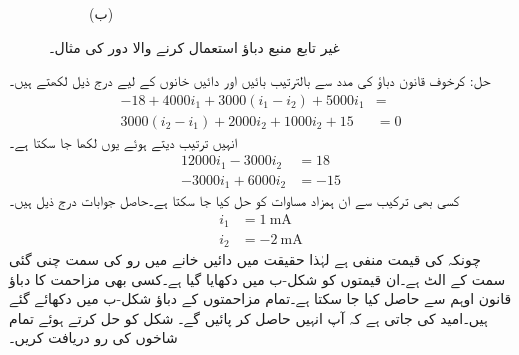 \begin{figure}
\begin{subfigure}{1\textwidth}
%
\caption*{(ب)}
\end{subfigure}
\caption{غیر تابع منبع دباؤ استعمال کرنے والا دور کی مثال۔}
\label{شکل_جوڑ_آزاد_منبع_دباو_دائری_مثال_الف}
\end{figure}%

حل: کرخوف قانون دباؤ کی مدد سے بالترتیب بائیں اور دائیں خانوں کے لیے درج ذیل لکھتے ہیں۔
\begin{align*}
-18+4000 i_1 +3000(i_1-i_2)+5000 i_1&=\\
3000(i_2-i_1)+2000 i_2+1000 i_2+15&=0
\end{align*} 
انہیں ترتیب دیتے ہوئے یوں لکھا جا سکتا ہے۔
\begin{align*}
12000 i_1-3000 i_2&=18\\
-3000 i_1+6000 i_2&=-15
\end{align*}
کسی بھی ترکیب سے ان ہمزاد مساوات کو حل کیا جا سکتا ہے۔حاصل جوابات درج ذیل ہیں۔
\begin{align*}
i_1&=\SI{1}{\milli\ampere}\\
i_2&=\SI{-2}{\milli\ampere}
\end{align*}
چونکہ  کی قیمت منفی ہے لہٰذا حقیقت میں دائیں خانے میں رو کی سمت چنی گئی سمت کے الٹ ہے۔ان قیمتوں کو شکل-ب میں دکھایا گیا ہے۔کسی بھی مزاحمت کا دباؤ قانون اوہم سے حاصل کیا جا سکتا ہے۔تمام مزاحمتوں کے دباؤ شکل-ب میں دکھائے گئے ہیں۔امید کی جاتی ہے کہ آپ انہیں حاصل کر پائیں گے۔
شکل  کو حل کرتے ہوئے  تمام شاخوں کی رو دریافت کریں۔

